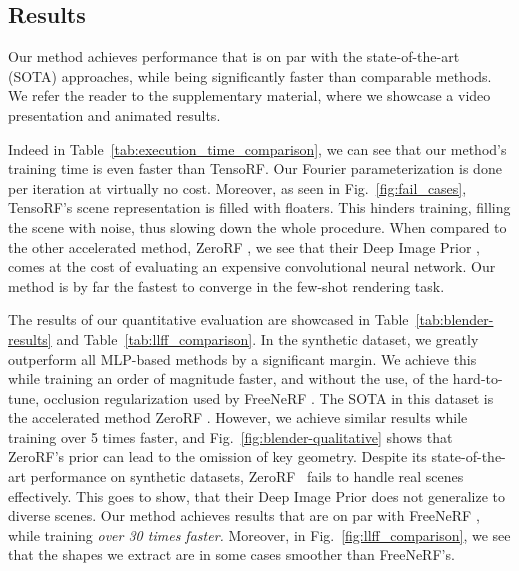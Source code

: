 \subsection{Results}


Our method achieves performance that is on par with the state-of-the-art (SOTA) approaches, while being significantly faster than comparable methods. We refer the reader to the supplementary material, where we showcase a video presentation and animated results.

Indeed in Table~\ref{tab:execution_time_comparison}, we can see that our method's training time is even faster than TensoRF. Our Fourier parameterization is done per iteration at virtually no cost. Moreover, as seen in Fig.~\ref{fig:fail_cases}, TensoRF's scene representation is filled with floaters. This hinders training, filling the scene with noise, thus slowing down the whole procedure. When compared to the other accelerated method, ZeroRF \cite{shi2024zerorf}, we see that their Deep Image Prior \cite{ulyanov2018deep}, comes at the cost of evaluating an expensive convolutional neural network. Our method is by far the fastest to converge in the few-shot rendering task.

The results of our quantitative evaluation are showcased in Table~\ref{tab:blender-results} and Table~\ref{tab:llff_comparison}. 
In the synthetic dataset, we greatly outperform all MLP-based methods by a significant margin. We achieve this while training an order of magnitude faster, and without the use, of the hard-to-tune, occlusion regularization used by FreeNeRF \cite{yang2023freenerf}. The SOTA in this dataset is the accelerated method ZeroRF \cite{shi2024zerorf}. However, we achieve similar results while training over 5 times faster, and Fig.~\ref{fig:blender-qualitative} shows that ZeroRF's prior can lead to the omission of key geometry. Despite its state-of-the-art performance on synthetic datasets, ZeroRF~\cite{shi2024zerorf} fails to handle real scenes effectively. This goes to show, that their Deep Image Prior \cite{ulyanov2018deep} does not generalize to diverse scenes. Our method achieves results that are on par with FreeNeRF \cite{yang2023freenerf}, while training \textit{over 30 times faster.} Moreover, in Fig.~\ref{fig:llff_comparison}, we see that the shapes we extract are in some cases smoother than FreeNeRF's. %

